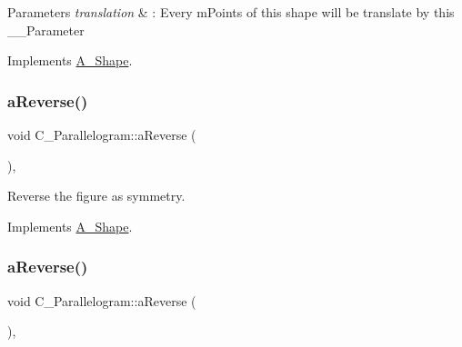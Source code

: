 \begin{DoxyParams}{Parameters}
{\em translation} & \+: Every m\+Points of this shape will be translate by this \+\_\+\+\_\+\+Parameter \\
\hline
\end{DoxyParams}


Implements \hyperlink{classA__Shape_ab284298db1b557ccfa7ba6de7a5fee2c}{A\+\_\+\+Shape}.

\mbox{\label{classC__Parallelogram_a573447294989d53fadf3d7adfb0640c6}} 
\subsubsection{\texorpdfstring{a\+Reverse()}{aReverse()}\hspace{0.1cm}{\footnotesize\ttfamily [1/2]}}
{\footnotesize\ttfamily void C\+\_\+\+Parallelogram\+::a\+Reverse (\begin{DoxyParamCaption}{ }\end{DoxyParamCaption})\hspace{0.3cm}{\ttfamily [override]}, {\ttfamily [virtual]}}



Reverse the figure as symmetry. 



Implements \hyperlink{classA__Shape_afe2c7969d647f6358da13879a7534ecb}{A\+\_\+\+Shape}.

\mbox{\label{classC__Parallelogram_a573447294989d53fadf3d7adfb0640c6}} 
\subsubsection{\texorpdfstring{a\+Reverse()}{aReverse()}\hspace{0.1cm}{\footnotesize\ttfamily [2/2]}}
{\footnotesize\ttfamily void C\+\_\+\+Parallelogram\+::a\+Reverse (\begin{DoxyParamCaption}{ }\end{DoxyParamCaption})\hspace{0.3cm}{\ttfamily [override]}, {\ttfamily [virtual]}}



